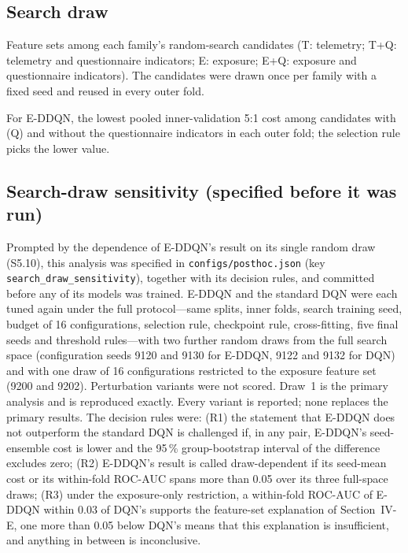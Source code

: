 \begin{center}\footnotesize

\end{center}

\subsection{Search draw}
Feature sets among each family's random-search candidates (T: telemetry; T+Q: telemetry and questionnaire indicators; E: exposure; E+Q: exposure and questionnaire indicators). The candidates were drawn once per family with a fixed seed and reused in every outer fold.

\begin{center}\footnotesize

\end{center}

For E-DDQN, the lowest pooled inner-validation 5:1 cost among candidates with (Q) and without the questionnaire indicators in each outer fold; the selection rule picks the lower value.

\begin{center}\footnotesize

\end{center}


\subsection{Search-draw sensitivity (specified before it was run)}
\label{sec:s-searchdraw}
Prompted by the dependence of E-DDQN's result on its single random draw (S5.10), this analysis was specified in \texttt{configs/\allowbreak posthoc.json} (key \texttt{search\_draw\_sensitivity}), together with its decision rules, and committed before any of its models was trained. E-DDQN and the standard DQN were each tuned again under the full protocol---same splits, inner folds, search training seed, budget of 16 configurations, selection rule, checkpoint rule, cross-fitting, five final seeds and threshold rules---with two further random draws from the full search space (configuration seeds 9120 and 9130 for E-DDQN, 9122 and 9132 for DQN) and with one draw of 16 configurations restricted to the exposure feature set (9200 and 9202). Perturbation variants were not scored. Draw~1 is the primary analysis and is reproduced exactly. Every variant is reported; none replaces the primary results. The decision rules were: (R1) the statement that E-DDQN does not outperform the standard DQN is challenged if, in any pair, E-DDQN's seed-ensemble cost is lower and the 95\,\% group-bootstrap interval of the difference excludes zero; (R2) E-DDQN's result is called draw-dependent if its seed-mean cost or its within-fold ROC-AUC spans more than 0.05 over its three full-space draws; (R3) under the exposure-only restriction, a within-fold ROC-AUC of E-DDQN within 0.03 of DQN's supports the feature-set explanation of Section~IV-E, one more than 0.05 below DQN's means that this explanation is insufficient, and anything in between is inconclusive.

